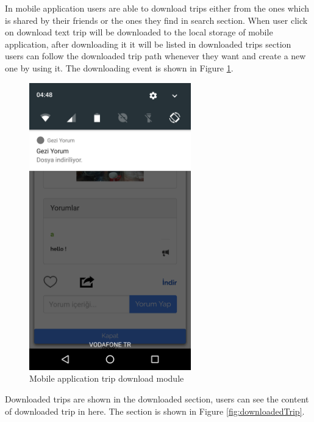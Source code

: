 \newpage

In mobile application users are able to download trips either from the ones which is shared by their friends or the ones they find in search section. When user click on download text trip will be downloaded to the local storage of mobile application, after downloading it it will be listed in downloaded trips section users can follow the downloaded trip path whenever they want and create a new one by using it. The downloading event is shown in Figure 
\ref{fig:tripDownload}.

\begin{figure}[!htbp]
\centering
\includegraphics[width=70mm,scale=0.7]{projectChapters/images/tripDownload.png}
\caption{Mobile application trip download module}
\label{fig:tripDownload}
\end{figure}


\newpage

Downloaded trips are shown in the downloaded section, users can see the content of downloaded trip in here. The section is shown in Figure 
\ref{fig:downloadedTrip}.

